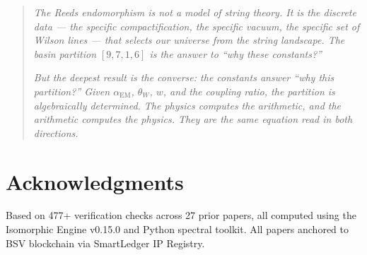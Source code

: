 \documentclass[12pt,a4paper]{article}
\theoremstyle{definition}\newtheorem{definition}[theorem]{Definition}
\theoremstyle{remark}\newtheorem{remark}[theorem]{Remark}
\begin{document}
\begin{quote}
\emph{The Reeds endomorphism is not a model of string theory. It is the discrete
data --- the specific compactification, the specific vacuum, the specific set of
Wilson lines --- that selects our universe from the string landscape. The basin
partition $[9,7,1,6]$ is the answer to ``why these constants?''}

\emph{But the deepest result is the converse: the constants answer ``why this
partition?'' Given $\alpha_{\mathrm{EM}}$, $\theta_W$, $w$, and the coupling
ratio, the partition is algebraically determined. The physics computes the
arithmetic, and the arithmetic computes the physics. They are the same equation
read in both directions.}
\end{quote}

\section*{Acknowledgments}

Based on 477+ verification checks across 27 prior papers, all computed using the
Isomorphic Engine v0.15.0 and Python spectral toolkit. All papers anchored to
BSV blockchain via SmartLedger IP Registry.
\end{document}
